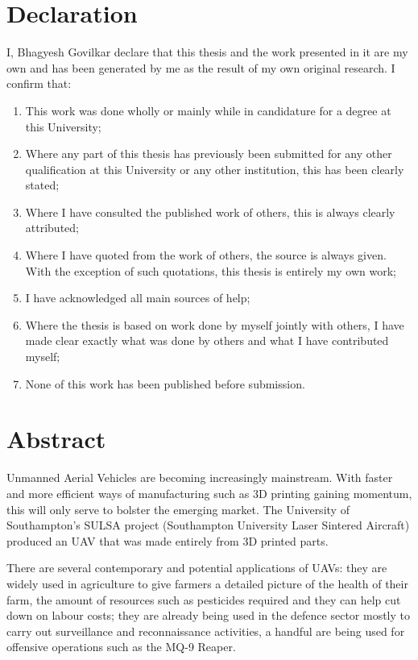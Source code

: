 \documentclass[
11pt, %
english, %
singlespacing, %
headsepline, %
]{MastersDoctoralThesis} %
\begin{document}

\section*{Declaration}
 I, Bhagyesh Govilkar declare that this thesis and the work presented in it are my own and has
been generated by me as the result of my own original research.
I confirm that:
\begin{enumerate}
\item  This work was done wholly or mainly while in candidature for a degree at this
University;
\item  Where any part of this thesis has previously been submitted for any other
qualification at this University or any other institution, this has been clearly stated;
\item  Where I have consulted the published work of others, this is always clearly
attributed;
\item  Where I have quoted from the work of others, the source is always given. With
the exception of such quotations, this thesis is entirely my own work;
\item  I have acknowledged all main sources of help;
\item  Where the thesis is based on work done by myself jointly with others, I have
made clear exactly what was done by others and what I have contributed myself;
\item  None of this work has been published before submission.
\end{enumerate}
 

\cleardoublepage


\section*{Abstract}
Unmanned Aerial Vehicles are becoming increasingly mainstream. With faster and more efficient ways of manufacturing such as 3D printing gaining momentum, this will only serve to bolster the emerging market. The University of Southampton's SULSA project (Southampton University Laser Sintered Aircraft) produced an UAV that was made entirely from 3D printed parts. 

There are several contemporary and potential applications of UAVs: they are widely used in agriculture to give farmers a detailed picture of the health of their farm, the amount of resources such as pesticides required and they can help cut down on labour costs; they are already being used in the defence sector mostly to carry out surveillance and reconnaissance activities, a handful are being used for offensive operations such as the MQ-9 Reaper. 
\end{document}
